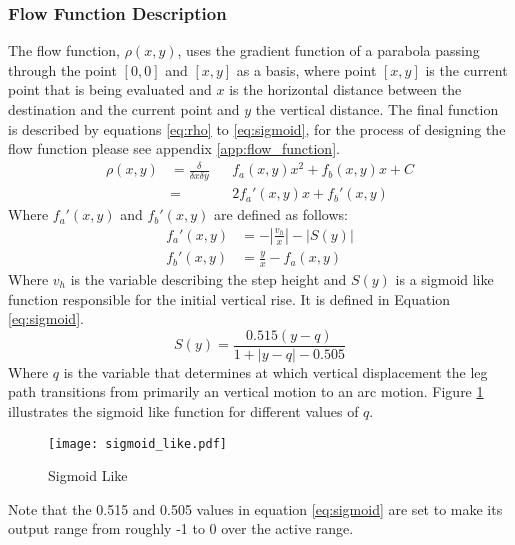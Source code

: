         \subsubsection{Flow Function Description} \label{sec:flow_function}
            The flow function, \(\rho(x,y)\), uses the gradient function of a parabola passing through the point \([0,0]\) and \([x,y]\) as a basis, where point \([x,y]\)
            is the current point that is being evaluated and \(x\) is the horizontal distance between the destination and the current point and \(y\) the
            vertical distance. The final function is described by equations \ref{eq:rho} to \ref{eq:sigmoid}, for the process of designing the flow function
            please see appendix \ref{app:flow_function}.
            \begin{equation} \label{eq:rho}
                \begin{aligned}
                    \rho(x,y) &= \frac{\delta}{\delta x\delta y}&&f_a(x,y)x^2 + f_b(x,y)x + C\\
                    &= &&2f_a'(x,y)x + f_b'(x,y)    
                \end{aligned}
            \end{equation}
            Where \(f_a'(x,y)\) and \(f_b'(x,y)\) are defined as follows:
            \begin{align} \label{eq:fa}
                f_a'(x,y) &= -\left|\frac{v_h}{x}\right| - \left|S(y)\right|\\
                f_b'(x,y) &= \frac{y}{x} - f_a(x,y)
            \end{align}
            Where \(v_h\) is the variable describing the step height and \(S(y)\) is a sigmoid like function 
            responsible for the initial vertical rise. It is defined in Equation \ref{eq:sigmoid}.
            \begin{equation} \label{eq:sigmoid}
                S(y) = \frac{0.515(y-q)}{1+\left|y-q\right|-0.505}
            \end{equation}
            Where \(q\) is the variable that determines at which vertical displacement the leg path transitions from primarily an vertical motion to
            an arc motion. Figure \ref{fig:sigmoid_like} illustrates the sigmoid like function for different values of \(q\).
            \begin{figure}[h]
                \centering
                \hspace{-1.38cm}
                \texttt{[image: sigmoid\_like.pdf]}
                \caption{Sigmoid Like}
                \label{fig:sigmoid_like}
            \end{figure}

            \noindent
            Note that the 0.515 and 0.505 values in equation \ref{eq:sigmoid} are set to make its output range from roughly -1 to 0 over the active range.






